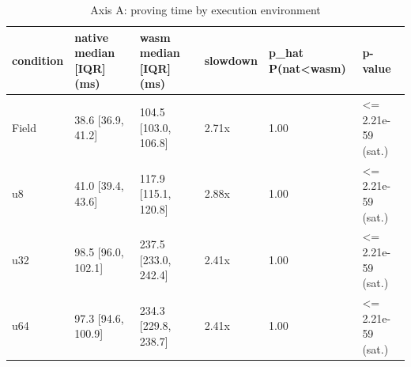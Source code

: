 \begin{table}[htbp]
\centering
\caption{Axis A: proving time by execution environment}
\label{tab:axis-a}
\begin{tabular}{llllll}
\toprule
condition & native median [IQR] (ms) & wasm median [IQR] (ms) & slowdown & p_hat P(nat<wasm) & p-value \\
\midrule
Field & 38.6 [36.9, 41.2] & 104.5 [103.0, 106.8] & 2.71x & 1.00 & <= 2.21e-59 (sat.) \\
u8 & 41.0 [39.4, 43.6] & 117.9 [115.1, 120.8] & 2.88x & 1.00 & <= 2.21e-59 (sat.) \\
u32 & 98.5 [96.0, 102.1] & 237.5 [233.0, 242.4] & 2.41x & 1.00 & <= 2.21e-59 (sat.) \\
u64 & 97.3 [94.6, 100.9] & 234.3 [229.8, 238.7] & 2.41x & 1.00 & <= 2.21e-59 (sat.) \\
\bottomrule
\end{tabular}
\end{table}
